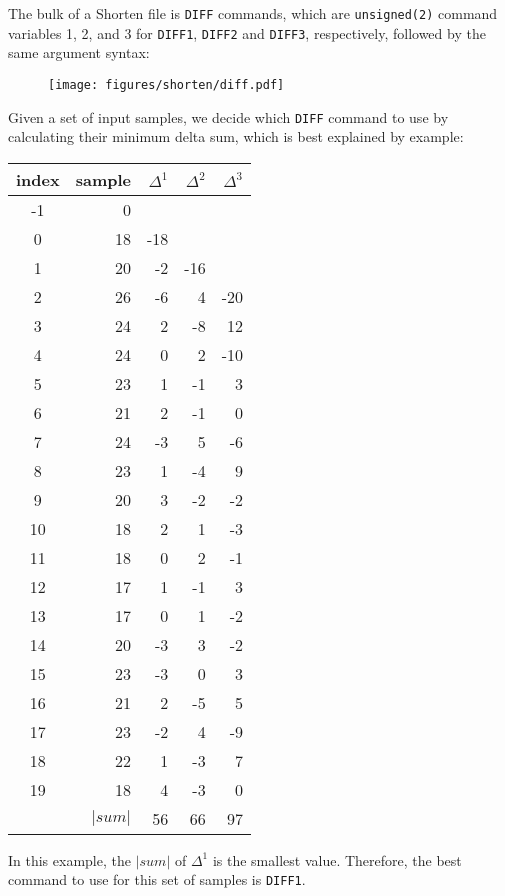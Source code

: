 The bulk of a Shorten file is \texttt{DIFF} commands,
which are \texttt{unsigned(2)} command variables 1, 2, and 3
for \texttt{DIFF1}, \texttt{DIFF2} and \texttt{DIFF3}, respectively,
followed by the same argument syntax:
\begin{figure}[h]
\texttt{[image: figures/shorten/diff.pdf]}
\end{figure}
\par
Given a set of input samples, we decide which \texttt{DIFF} command
to use by calculating their minimum delta sum, which is best
explained by example:
\par
\begin{table}[h]
{
\begin{tabular}{|c|r|r|r|r|}
\hline
index & sample & $\Delta^1$ & $\Delta^2$ & $\Delta^3$ \\
\hline
-1 & 0 & & & \\
0 & 18 & -18 & & \\
1 & 20 & -2 & -16 & \\
2 & 26 & -6 & 4 & -20 \\
3 & 24 & 2 & -8 & 12 \\
4 & 24 & 0 & 2 & -10 \\
5 & 23 & 1 & -1 & 3 \\
6 & 21 & 2 & -1 & 0 \\
7 & 24 & -3 & 5 & -6 \\
8 & 23 & 1 & -4 & 9 \\
9 & 20 & 3 & -2 & -2 \\
10 & 18 & 2 & 1 & -3 \\
11 & 18 & 0 & 2 & -1 \\
12 & 17 & 1 & -1 & 3 \\
13 & 17 & 0 & 1 & -2 \\
14 & 20 & -3 & 3 & -2 \\
15 & 23 & -3 & 0 & 3 \\
16 & 21 & 2 & -5 & 5 \\
17 & 23 & -2 & 4 & -9 \\
18 & 22 & 1 & -3 & 7 \\
19 & 18 & 4 & -3 & 0 \\
\hline
\multicolumn{2}{|r|}{$| sum |$} & 56 & 66 & 97 \\
\hline
\end{tabular}
}
\end{table}
\par
\noindent
In this example, the $|sum|$ of $\Delta^1$ is the smallest value.
Therefore, the best command to use for this set of samples is \texttt{DIFF1}.
